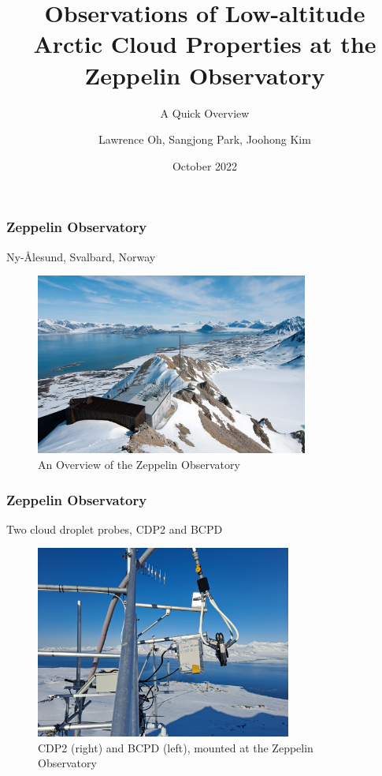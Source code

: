 \documentclass{beamer}
\title{Observations of Low-altitude Arctic Cloud Properties at the Zeppelin Observatory}
\subtitle{A Quick Overview}
\author{Lawrence Oh, Sangjong Park, Joohong Kim}
\institute{Korea Polar Research Institute (KOPRI)}
\date{October 2022}
\begin{document}
\frame{\titlepage}

\begin{frame}
    \frametitle{Zeppelin Observatory}
    Ny-\r{A}lesund, Svalbard, Norway

    \begin{figure}
        \centering
        \includegraphics[width=0.8\textwidth]{img/zepp.jpeg}
        \caption{ An Overview of the Zeppelin Observatory }
    \end{figure}
\end{frame}

\begin{frame}
    \frametitle{Zeppelin Observatory}
    Two cloud droplet probes, CDP2 and BCPD

    \begin{figure}
        \centering
        \includegraphics[width=0.75\textwidth]{img/zepp_cdp.jpg}
        \caption{ CDP2 (right) and BCPD (left), mounted at the Zeppelin Observatory }
    \end{figure}
\end{frame}
\end{document}
